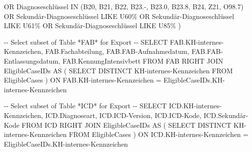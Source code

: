 \documentclass[
  letterpaper,
  DIV=11,
  numbers=noendperiod]{scrreprt}
\newenvironment{Shaded}{\begin{snugshade}}{\end{snugshade}}
\newcommand{\CommentTok}[1]{\textcolor[rgb]{0.37,0.37,0.37}{#1}}
\newcommand{\KeywordTok}[1]{\textcolor[rgb]{0.00,0.23,0.31}{#1}}
\newcommand{\NormalTok}[1]{\textcolor[rgb]{0.00,0.23,0.31}{#1}}
\newcommand{\OperatorTok}[1]{\textcolor[rgb]{0.37,0.37,0.37}{#1}}
\newcommand{\StringTok}[1]{\textcolor[rgb]{0.13,0.47,0.30}{#1}}
\begin{document}
\begin{Shaded}
\begin{Highlighting}[]
         \KeywordTok{OR}\NormalTok{ Diagnoseschlüssel }\KeywordTok{IN}\NormalTok{ (}\StringTok{\textquotesingle{}B20\textquotesingle{}}\NormalTok{, }\StringTok{\textquotesingle{}B21\textquotesingle{}}\NormalTok{, }\StringTok{\textquotesingle{}B22\textquotesingle{}}\NormalTok{, }\StringTok{\textquotesingle{}B23.{-}\textquotesingle{}}\NormalTok{, }\StringTok{\textquotesingle{}B23.0\textquotesingle{}}\NormalTok{, }\StringTok{\textquotesingle{}B23.8\textquotesingle{}}\NormalTok{, }\StringTok{\textquotesingle{}B24\textquotesingle{}}\NormalTok{, }\StringTok{\textquotesingle{}Z21\textquotesingle{}}\NormalTok{, }\StringTok{\textquotesingle{}O98.7\textquotesingle{}}\NormalTok{)}
         \KeywordTok{OR}\NormalTok{ Sekundär}\OperatorTok{{-}}\NormalTok{Diagnoseschlüssel }\KeywordTok{LIKE} \StringTok{\textquotesingle{}U60\%\textquotesingle{}}
         \KeywordTok{OR}\NormalTok{ Sekundär}\OperatorTok{{-}}\NormalTok{Diagnoseschlüssel }\KeywordTok{LIKE} \StringTok{\textquotesingle{}U61\%\textquotesingle{}}
         \KeywordTok{OR}\NormalTok{ Sekundär}\OperatorTok{{-}}\NormalTok{Diagnoseschlüssel }\KeywordTok{LIKE} \StringTok{\textquotesingle{}U85\%\textquotesingle{}}\NormalTok{ )}


\CommentTok{{-}{-} Select subset of Table *FAB* for Export {-}{-}}
\KeywordTok{SELECT}\NormalTok{ FAB.KH}\OperatorTok{{-}}\NormalTok{internes}\OperatorTok{{-}}\NormalTok{Kennzeichen,}
\NormalTok{       FAB.Fachabteilung,}
\NormalTok{       FAB.FAB}\OperatorTok{{-}}\NormalTok{Aufnahmedatum,}
\NormalTok{       FAB.FAB}\OperatorTok{{-}}\NormalTok{Entlassungsdatum,}
\NormalTok{       FAB.KennungIntensivbett}
\KeywordTok{FROM}\NormalTok{ FAB }\KeywordTok{RIGHT} \KeywordTok{JOIN}\NormalTok{ EligibleCaseIDs }\KeywordTok{AS}
\NormalTok{                    ( }\KeywordTok{SELECT} \KeywordTok{DISTINCT}\NormalTok{ KH}\OperatorTok{{-}}\NormalTok{internes}\OperatorTok{{-}}\NormalTok{Kennzeichen }\KeywordTok{FROM}\NormalTok{ EligibleCases )}
         \KeywordTok{ON}\NormalTok{ FAB.KH}\OperatorTok{{-}}\NormalTok{internes}\OperatorTok{{-}}\NormalTok{Kennzeichen }\OperatorTok{=}\NormalTok{ EligibleCaseIDs.KH}\OperatorTok{{-}}\NormalTok{internes}\OperatorTok{{-}}\NormalTok{Kennzeichen}


\CommentTok{{-}{-} Select subset of Table *ICD* for Export {-}{-}}
\KeywordTok{SELECT}\NormalTok{ ICD.KH}\OperatorTok{{-}}\NormalTok{internes}\OperatorTok{{-}}\NormalTok{Kennzeichen,}
\NormalTok{       ICD.Diagnoseart,}
\NormalTok{       ICD.ICD}\OperatorTok{{-}}\NormalTok{Version,}
\NormalTok{       ICD.ICD}\OperatorTok{{-}}\NormalTok{Kode,}
\NormalTok{       ICD.Sekundär}\OperatorTok{{-}}\NormalTok{Kode}
\KeywordTok{FROM}\NormalTok{ ICD }\KeywordTok{RIGHT} \KeywordTok{JOIN}\NormalTok{ EligibleCaseIDs }\KeywordTok{AS}
\NormalTok{                    ( }\KeywordTok{SELECT} \KeywordTok{DISTINCT}\NormalTok{ KH}\OperatorTok{{-}}\NormalTok{internes}\OperatorTok{{-}}\NormalTok{Kennzeichen }\KeywordTok{FROM}\NormalTok{ EligibleCases )}
         \KeywordTok{ON}\NormalTok{ ICD.KH}\OperatorTok{{-}}\NormalTok{internes}\OperatorTok{{-}}\NormalTok{Kennzeichen }\OperatorTok{=}\NormalTok{ EligibleCaseIDs.KH}\OperatorTok{{-}}\NormalTok{internes}\OperatorTok{{-}}\NormalTok{Kennzeichen}



\end{Highlighting}
\end{Shaded}
\end{document}
